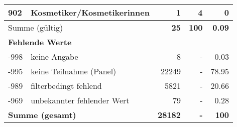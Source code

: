 \begin{longtable}{lXrrr}
     902 &
     \multicolumn{1}{X}{ Kosmetiker/Kosmetikerinnen   } &


       \num{1} &
       \num[round-mode=places,round-precision=2]{4} &
         \num[round-mode=places,round-precision=2]{0} \\
     \midrule
     \multicolumn{2}{l}{Summe (gültig)} &
       \textbf{\num{25}} &
     \textbf{100} &
       \textbf{\num[round-mode=places,round-precision=2]{0,09}} \\
     \multicolumn{5}{l}{\textbf{Fehlende Werte}}\\
       -998 &
       keine Angabe &
         \num{8} &
        - &
         \num[round-mode=places,round-precision=2]{0,03} \\
       -995 &
       keine Teilnahme (Panel) &
         \num{22249} &
        - &
         \num[round-mode=places,round-precision=2]{78,95} \\
       -989 &
       filterbedingt fehlend &
         \num{5821} &
        - &
         \num[round-mode=places,round-precision=2]{20,66} \\
       -969 &
       unbekannter fehlender Wert &
         \num{79} &
        - &
         \num[round-mode=places,round-precision=2]{0,28} \\
     \midrule
     \multicolumn{2}{l}{\textbf{Summe (gesamt)}} &
          \textbf{\num{28182}} &
        \textbf{-} &
        \textbf{100} \\
     \bottomrule
     \end{longtable}
     
